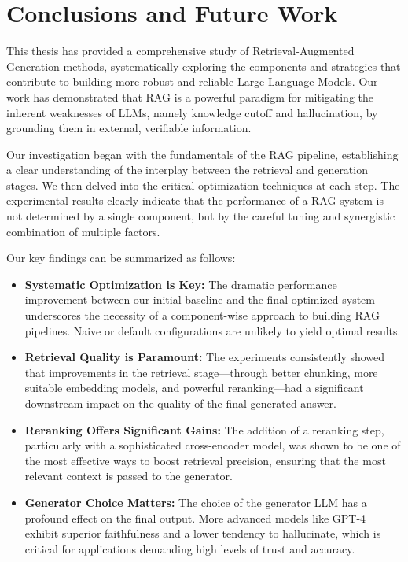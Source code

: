 \chapter{Conclusions and Future Work}
\label{chap:conclusions}

This thesis has provided a comprehensive study of Retrieval-Augmented Generation methods, systematically exploring the components and strategies that contribute to building more robust and reliable Large Language Models. Our work has demonstrated that RAG is a powerful paradigm for mitigating the inherent weaknesses of LLMs, namely knowledge cutoff and hallucination, by grounding them in external, verifiable information.

Our investigation began with the fundamentals of the RAG pipeline, establishing a clear understanding of the interplay between the retrieval and generation stages. We then delved into the critical optimization techniques at each step. The experimental results clearly indicate that the performance of a RAG system is not determined by a single component, but by the careful tuning and synergistic combination of multiple factors. 

Our key findings can be summarized as follows:
\begin{itemize}
    \item \textbf{Systematic Optimization is Key:} The dramatic performance improvement between our initial baseline and the final optimized system underscores the necessity of a component-wise approach to building RAG pipelines. Naive or default configurations are unlikely to yield optimal results.
    \item \textbf{Retrieval Quality is Paramount:} The experiments consistently showed that improvements in the retrieval stage—through better chunking, more suitable embedding models, and powerful reranking—had a significant downstream impact on the quality of the final generated answer.
    \item \textbf{Reranking Offers Significant Gains:} The addition of a reranking step, particularly with a sophisticated cross-encoder model, was shown to be one of the most effective ways to boost retrieval precision, ensuring that the most relevant context is passed to the generator.
    \item \textbf{Generator Choice Matters:} The choice of the generator LLM has a profound effect on the final output. More advanced models like GPT-4 exhibit superior faithfulness and a lower tendency to hallucinate, which is critical for applications demanding high levels of trust and accuracy.
\end{itemize}

